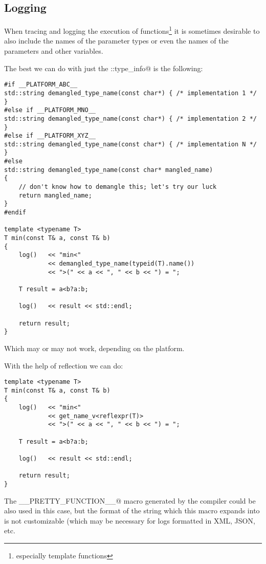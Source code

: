 \subsection{Logging}

When tracing and logging the execution of functions\footnote{especially template
functions} it is sometimes desirable to also include the names of the parameter
types or even the names of the parameters and other variables.

The best we can do with just the \verb@std::type_info@ is the following:

\begin{verbatim}
#if __PLATFORM_ABC__
std::string demangled_type_name(const char*) { /* implementation 1 */ }
#else if __PLATFORM_MNO__
std::string demangled_type_name(const char*) { /* implementation 2 */ }
#else if __PLATFORM_XYZ__
std::string demangled_type_name(const char*) { /* implementation N */ }
#else
std::string demangled_type_name(const char* mangled_name)
{
	// don't know how to demangle this; let's try our luck
	return mangled_name;
}
#endif

template <typename T>
T min(const T& a, const T& b)
{
	log()   << "min<"
	        << demangled_type_name(typeid(T).name())
	        << ">(" << a << ", " << b << ") = ";

	T result = a<b?a:b;

	log()   << result << std::endl;

	return result;
}

\end{verbatim}

Which may or may not work, depending on the platform.

With the help of reflection we can do:

\begin{verbatim}
template <typename T>
T min(const T& a, const T& b)
{
	log()   << "min<"
	        << get_name_v<reflexpr(T)>
	        << ">(" << a << ", " << b << ") = ";

	T result = a<b?a:b;

	log()   << result << std::endl;

	return result;
}
\end{verbatim}

The \verb@__PRETTY_FUNCTION__@ macro generated by the compiler could be also
used in this case, but the format of the string which this macro expands into
is not customizable (which may be necessary for logs formatted in XML, JSON, etc.

